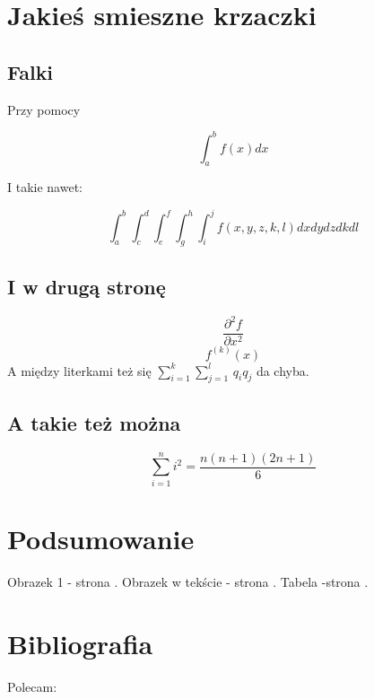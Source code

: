 \documentclass{article}
\begin{document}
\newpage
\section{Jakieś smieszne krzaczki}

\subsection{Falki} 

Przy pomocy \cite{Miotk}

$$\int_{a}^b f(x)dx$$

I takie nawet:

$$\int_{a}^b\int_{c}^d\int_{e}^f\int_{g}^h\int_{i}^j f(x,y,z,k,l)dxdydzdkdl$$

\subsection{I w drugą stronę} 

$$\frac{\partial^2 f}{\partial x^2}$$  $$f^{(k)}(x)$$
A między literkami też się $\sum^k_{i=1}\sum^l_{j=1}\,q_i q_j$ da chyba.

\subsection{A takie też można} 

$$\sum_{i=1}^n i^2 = \frac{n(n+1)(2n+1)}{6}$$

\section{Podsumowanie}

Obrazek 1 - strona \pageref{o0}.
Obrazek w tekście - strona \pageref{o1}.
Tabela -strona \pageref{tab}.

\newpage
\section{Bibliografia}\label{bb}

Polecam: \cite{A1} \cite{A2} \cite{K1} \cite{Ref1} \cite{U1} \cite{Man1}



\end{document}
